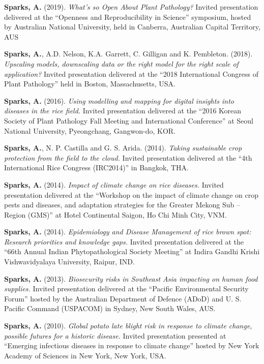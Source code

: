 \documentclass[11pt, a4paper]{awesome-cv}
\begin{document}
\textbf{Sparks, A.} (2019). \emph{What's so Open About Plant Pathology?} Invited presentation delivered at the ``Openness and Reproducibility in Science'' symposium, hosted by Australian National University, held in Canberra, Australian Capital Territory, AUS

\textbf{Sparks, A.}, A.D. Nelson, K.A. Garrett, C. Gilligan and K. Pembleton. (2018). \emph{Upscaling models, downscaling data or the right model for the right scale of application?} Invited presentation delivered at the ``2018 International Congress of Plant Pathology'' held in Boston, Massachusetts, USA.

\textbf{Sparks, A.} (2016). \emph{Using modelling and mapping for digital insights into diseases in the rice field.} Invited presentation delivered at the ``2016 Korean Society of Plant Pathology Fall Meeting and International Conference'' at Seoul National University, Pyeongchang, Gangwon-do, KOR.

\textbf{Sparks, A.}, N. P. Castilla and G. S. Arida. (2014). \emph{Taking sustainable crop protection from the field to the cloud.} Invited presentation delivered at the ``4th International Rice Congress (IRC2014)'' in Bangkok, THA.

\textbf{Sparks, A.} (2014). \emph{Impact of climate change on rice diseases.} Invited presentation delivered at the ``Workshop on the impact of climate change on crop pests and diseases, and adaptation strategies for the Greater Mekong Sub -- Region (GMS)'' at Hotel Continental Saigon, Ho Chi Minh City, VNM.

\textbf{Sparks, A.} (2014). \emph{Epidemiology and Disease Management of rice brown spot: Research priorities and knowledge gaps.} Invited presentation delivered at the ``66th Annual Indian Phytopathological Society Meeting'' at Indira Gandhi Krishi Vishwavidyalaya University, Raipur, IND.

\textbf{Sparks, A.} (2013). \emph{Biosecurity risks in Southeast Asia impacting on human food supplies.} Invited presentation delivered at the ``Pacific Environmental Security Forum'' hosted by the Australian Department of Defence (ADoD) and U. S. Pacific Command (USPACOM) in Sydney, New South Wales, AUS.

\textbf{Sparks, A.} (2010). \emph{Global potato late blight risk in response to climate change, possible futures for a historic disease.} Invited presentation presented at ``Emerging infectious diseases in response to climate change'' hosted by New York Academy of Sciences in New York, New York, USA.
\end{document}
